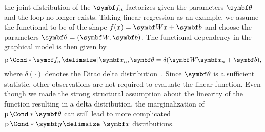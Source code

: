 the joint distribution of the $\mat{f}_n$ factorizes given the parameters $\mat{\theta}$ and the loop no longer exists.
Taking linear regression as an example, we assume the functional to be of the shape $f(x) = \mat{W}x + \mat{b}$ and choose the parameters $\mat{\theta} = (\mat{W}, \mat{b})$.
The functional dependency in the graphical model is then given by
\begin{align}
    \begin{split}
        \Prob*{\mat{f}_n \given \mat{x}_n, \mat{\theta}} = \delta(\mat{W}\mat{x}_n + \mat{b}),
    \end{split}
\end{align}
where $\delta(\cdot)$ denotes the Dirac delta distribution~\parencite{murphy_machine_2012}.
Since $\mat{\theta}$ is a sufficient statistic, other observations are not required to evaluate the linear function.
Even though we made the strong structural assumption about the linearity of the function resulting in a delta distribution, the marginalization of $\Prob*{\mat{\theta}}$ can still lead to more complicated $\Prob*{\mat{y} \given \mat{x}}$ distributions.

